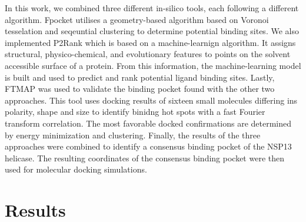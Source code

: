 \documentclass[11pt, letterpaper, titlepage]{article}
\renewcommand{\cite}{\parencite}
\begin{document}
In this work, we combined three different in-silico tools, each following a different algorithm. 
Fpocket \cite{package_Fpocket} utilises a geometry-based algorithm based on Voronoi tesselation and seqeuntial clustering to determine potential binding sites. We also implemented P2Rank \cite{package_P2Rank, package_PrankWeb, package_PrankWeb3} which is based on a machine-learnign algorithm. It assigns structural, physico-chemical, and evolutionary features to points on the solvent accessible surface of a protein. From this information, the machine-learning model is built and used to predict and rank potential ligand binding sites. Lastly, FTMAP \cite{package_FTMAP} was used to validate the binding pocket found with the other two approaches. This tool uses docking results of sixteen small molecules differing ins polarity, shape and size to identify binidng hot spots with a fast Fourier transform correlation. The most favorable docked confirmations are determined by energy minimization and clustering.
Finally, the results of the three approaches were combined to identify a consensus binding pocket of the NSP13 helicase. The resulting coordinates of the consensus binding pocket were then used for molecular docking simulations. 

\section{Results} 
\end{document}
